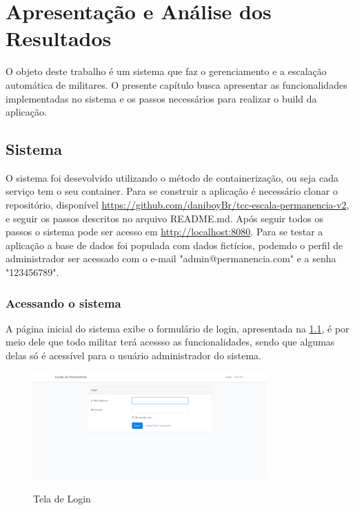 \chapter{Apresentação e Análise dos Resultados}
O objeto deste trabalho é um sistema que faz o gerenciamento e a escalação automática de militares. O presente capítulo busca apresentar as funcionalidades implementadas no sistema e os passos necessários para realizar o build da aplicação.

\section{Sistema}

O sistema foi desevolvido utilizando o método de containerização, ou seja cada serviço tem o seu container. Para se construir a aplicação é necessário clonar o repositório, disponível \url{https://github.com/daniboyBr/tcc-escala-permanencia-v2}, e seguir os passos descritos no arquivo README.md. Após seguir todos os passos o sistema pode ser acesso em \url{http://localhost:8080}. Para se testar a aplicação a base de dados foi populada com dados fictícios, podemdo o perfil de administrador ser acessado com o e-mail "admin@permanencia.com" e a senha "123456789".

\subsection{Acessando o sistema}

A página inicial do sistema exibe o formulário de login, apresentada na \ref{fig:login}, é por meio dele que todo militar terá acessso as funcionalidades, sendo que algumas delas só é acessível para o usuário administrador do sistema.

\begin{figure}[!htb]
    \centering
    \caption{Tela de Login}
    \includegraphics[width=0.8\textwidth]{images/1 - Pagina Inicial - Tela de Login.png}
    \label{fig:login}
\end{figure}

